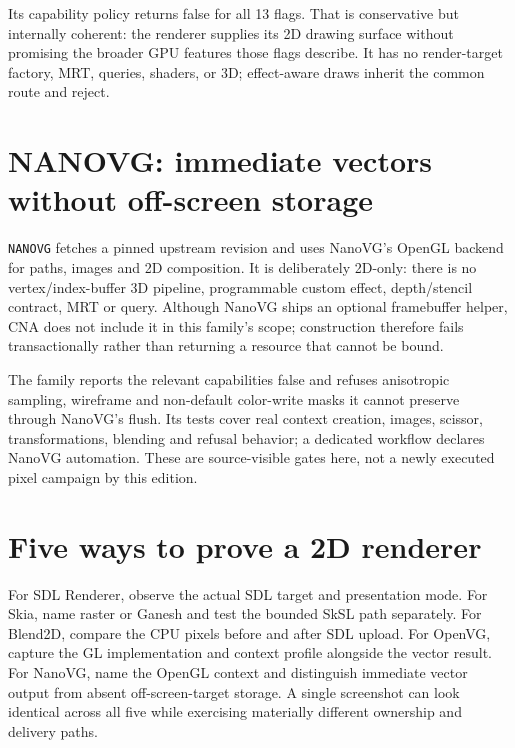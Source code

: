 Its capability policy returns false for all 13 flags.  That is conservative but internally
coherent: the renderer supplies its 2D drawing surface without promising the broader GPU
features those flags describe.  It has no render-target factory, MRT, queries, shaders, or 3D;
effect-aware draws inherit the common route and reject.

\section{NANOVG: immediate vectors without off-screen storage}

\texttt{NANOVG} fetches a pinned upstream revision and uses NanoVG's OpenGL backend for paths,
images and 2D composition. It is deliberately 2D-only: there is no vertex/index-buffer 3D
pipeline, programmable custom effect, depth/stencil contract, MRT or query. Although NanoVG ships
an optional framebuffer helper, CNA does not include it in this family's scope;
 construction therefore fails transactionally rather than returning a
resource that cannot be bound.

The family reports the relevant capabilities false and refuses anisotropic sampling, wireframe
and non-default color-write masks it cannot preserve through NanoVG's flush. Its tests cover real
context creation, images, scissor, transformations, blending and refusal behavior; a dedicated
workflow declares NanoVG automation. These are source-visible gates here, not a newly executed
pixel campaign by this edition.

\section{Five ways to prove a 2D renderer}

For SDL Renderer, observe the actual SDL target and presentation mode. For Skia, name raster
or Ganesh and test the bounded SkSL path separately.  For Blend2D, compare the CPU pixels before
and after SDL upload.  For OpenVG, capture the GL implementation and context profile alongside
the vector result. For NanoVG, name the OpenGL context and distinguish immediate vector output
from absent off-screen-target storage. A single screenshot can look identical across all five
while exercising materially different ownership and delivery paths.
